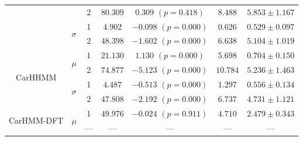 \documentclass{article}
\begin{document}
\begin{center}
{\begin{tabular}{ccccccc}
                                    &                               & 2                             & $80.309$                       & $0.309$ $(p=0.418)$        & $8.488$                             & $5.853 \pm 1.167$                           \\
                                    & \multirow{2}{*}{$\sigma$}     & 1                             & $4.902$                        & $-0.098$ $(p=0.000)$       & $0.626$                             & $0.529 \pm 0.097$                           \\
                                    &                               & 2                             & $48.398$                       & $-1.602$ $(p=0.000)$       & $6.638$                             & $5.104 \pm 1.019$                           \\ \hline
        \multirow{4}{*}{CarHHMM}    & \multirow{2}{*}{$\mu$}        & 1                             & $21.130$                       & $1.130$ $(p=0.000)$        & $5.698$                             & $0.704 \pm 0.150$                           \\
                                    &                               & 2                             & $74.877$                       & $-5.123$ $(p=0.000)$       & $10.784$                            & $5.236 \pm 1.463$                           \\
                                    & \multirow{2}{*}{$\sigma$}     & 1                             & $4.487$                        & $-0.513$ $(p=0.000)$       & $1.297$                             & $0.556 \pm 0.134$                           \\
                                    &                               & 2                             & $47.808$                       & $-2.192$ $(p=0.000)$       & $6.737$                             & $4.731 \pm 1.121$                           \\ \hline
        \multirow{4}{*}{CarHMM-DFT} & \multirow{2}{*}{$\mu$}        & 1                             & $49.976$                       & $-0.024$ $(p=0.911)$       & $4.710$                             & $2.479 \pm 0.343$                           \\
                                    &                               & ---                           & ---                            & ---                        & ---                                 & ---                                         \\

\end{tabular}}
\end{center}
\end{document}
